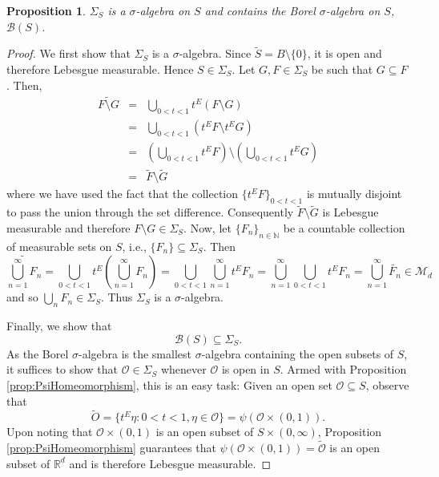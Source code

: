 \documentclass[11pt]{article}
\theoremstyle{theorem}
\newtheorem{proposition}[theorem]{Proposition}
\begin{document}
\begin{proposition}
$\Sigma_S$ is a $\sigma$-algebra on $S$ and contains the Borel $\sigma$-algebra on $S$, $\mathcal{B}(S)$.
\end{proposition}

\begin{proof}
We first show that $\Sigma_S$ is a $\sigma$-algebra. Since $\widetilde S=B\setminus\{0\}$, it is open and therefore Lebesgue measurable. Hence $S\in \Sigma_S$. Let $G, F\in \Sigma_S$ be such that $G\subseteq F$. Then,
\begin{eqnarray*}
\widetilde{F\setminus G}&=&\bigcup_{0<t<1}t^E\left(F\setminus G\right)\\
&=&\bigcup_{0<t<1}\left(t^EF\setminus t^E G\right)\\
&=&\left(\bigcup_{0<t<1}t^E F\right)\setminus\left(\bigcup_{0<t<1}t^E G\right)\\
&=&\widetilde F\setminus \widetilde G
\end{eqnarray*}
where we have used the fact that the collection $\{t^E F\}_{0<t<1}$ is mutually disjoint to pass the union through the set difference. Consequently $\widetilde F\setminus \tilde{G}$ is Lebesgue measurable and therefore $F\setminus G\in \Sigma_S$.  Now, let $\{F_n\}_{n\in\mathbb{N}}$ be a countable collection of measurable sets on $S$, i.e., $\{F_n\}\subseteq \Sigma_S$. Then
\begin{equation*}
    \widetilde{\bigcup_{n=1}^\infty F_n}= \bigcup_{0<t<1} t^E \left(\bigcup_{n=1}^\infty F_n\right)= \bigcup_{0 <t < 1}  \bigcup_{n=1}^\infty  t^E F_n =\bigcup_{n=1}^\infty \bigcup_{0 <t < 1}  t^E F_n =\bigcup_{n=1}^\infty \widetilde{F_n} \in \mathcal{M}_d
\end{equation*}
and so $\bigcup_n F_n\in \Sigma_S$. Thus $\Sigma_S$ is a $\sigma$-algebra. 

Finally, we show that
\begin{equation*}
\mathcal{B}(S)\subseteq\Sigma_S.
\end{equation*}
As the Borel $\sigma$-algebra is the smallest $\sigma$-algebra containing the open subsets of $S$, it suffices to show that $\mathcal{O}\in \Sigma_S$ whenever $\mathcal{O}$ is open in $S$. Armed with Proposition \ref{prop:PsiHomeomorphism}, this is an easy task: Given an open set $\mathcal{O}\subseteq S$, observe that
\begin{equation*}
\widetilde{O}=\{t^E\eta:0<t<1,\eta\in\mathcal{O}\}=\psi(\mathcal{O}\times (0,1)).
\end{equation*}
Upon noting that $\mathcal{O}\times (0,1)$ is an open subset of $S\times (0,\infty)$, Proposition \ref{prop:PsiHomeomorphism} guarantees that $\psi(\mathcal{O}\times (0,1))=\widetilde{\mathcal{O}}$ is an open subset of $\mathbb{R}^d$ and is therefore Lebesgue measurable. 
\end{proof}
\end{document}
